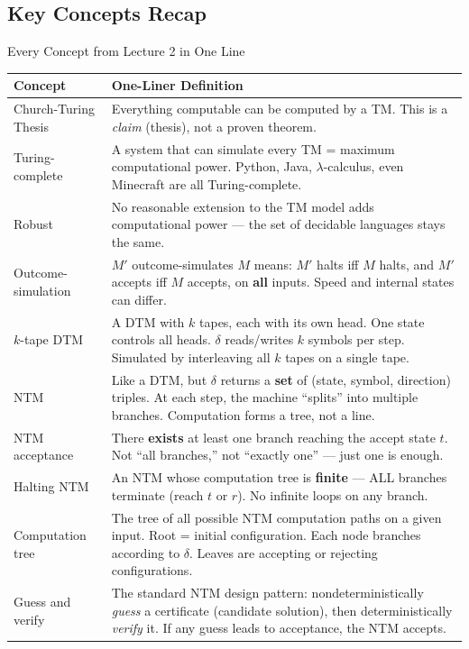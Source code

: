 \subsection{Key Concepts Recap}

\begin{definitionbox}{Every Concept from Lecture 2 in One Line}
\begin{center}
\renewcommand{\arraystretch}{1.5}
\begin{tabular}{p{3.8cm}p{10.5cm}}
\toprule
\textbf{Concept} & \textbf{One-Liner Definition} \\
\midrule
Church-Turing Thesis & Everything computable can be computed by a TM. This is a \emph{claim} (thesis), not a proven theorem. \\
Turing-complete & A system that can simulate every TM = maximum computational power. Python, Java, $\lambda$-calculus, even Minecraft are all Turing-complete. \\
Robust & No reasonable extension to the TM model adds computational power --- the set of decidable languages stays the same. \\
Outcome-simulation & $M'$ outcome-simulates $M$ means: $M'$ halts iff $M$ halts, and $M'$ accepts iff $M$ accepts, on \textbf{all} inputs. Speed and internal states can differ. \\
$k$-tape DTM & A DTM with $k$ tapes, each with its own head. One state controls all heads. $\delta$ reads/writes $k$ symbols per step. Simulated by interleaving all $k$ tapes on a single tape. \\
NTM & Like a DTM, but $\delta$ returns a \textbf{set} of (state, symbol, direction) triples. At each step, the machine ``splits'' into multiple branches. Computation forms a tree, not a line. \\
NTM acceptance & There \textbf{exists} at least one branch reaching the accept state $t$. Not ``all branches,'' not ``exactly one'' --- just one is enough. \\
Halting NTM & An NTM whose computation tree is \textbf{finite} --- ALL branches terminate (reach $t$ or $r$). No infinite loops on any branch. \\
Computation tree & The tree of all possible NTM computation paths on a given input. Root = initial configuration. Each node branches according to $\delta$. Leaves are accepting or rejecting configurations. \\
Guess and verify & The standard NTM design pattern: nondeterministically \emph{guess} a certificate (candidate solution), then deterministically \emph{verify} it. If any guess leads to acceptance, the NTM accepts. \\
\bottomrule
\end{tabular}
\end{center}
\end{definitionbox}

